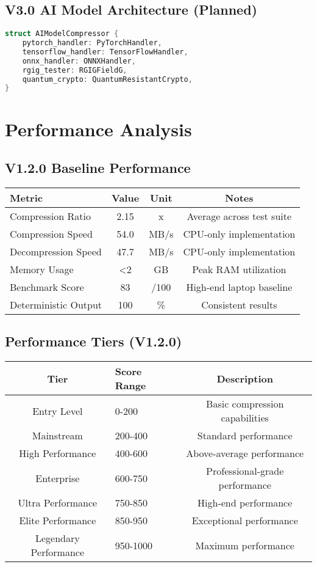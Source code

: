 \documentclass[12pt,a4paper]{article}
\begin{document}
\subsection{V3.0 AI Model Architecture (Planned)}
\begin{lstlisting}[language=C, caption=AI Model Compressor Structure]
struct AIModelCompressor {
    pytorch_handler: PyTorchHandler,
    tensorflow_handler: TensorFlowHandler,
    onnx_handler: ONNXHandler,
    rgig_tester: RGIGFieldG,
    quantum_crypto: QuantumResistantCrypto,
}
\end{lstlisting}

\newpage

\section{Performance Analysis}

\subsection{V1.2.0 Baseline Performance}
\begin{center}
\begin{tabular}{|l|c|c|c|}
\hline
\textbf{Metric} & \textbf{Value} & \textbf{Unit} & \textbf{Notes} \\
\hline
Compression Ratio & 2.15 & x & Average across test suite \\
Compression Speed & 54.0 & MB/s & CPU-only implementation \\
Decompression Speed & 47.7 & MB/s & CPU-only implementation \\
Memory Usage & <2 & GB & Peak RAM utilization \\
Benchmark Score & 83 & /100 & High-end laptop baseline \\
Deterministic Output & 100 & \% & Consistent results \\
\hline
\end{tabular}
\end{center}

\subsection{Performance Tiers (V1.2.0)}
\begin{center}
\begin{tabular}{|c|l|c|}
\hline
\textbf{Tier} & \textbf{Score Range} & \textbf{Description} \\
\hline
Entry Level & 0-200 & Basic compression capabilities \\
Mainstream & 200-400 & Standard performance \\
High Performance & 400-600 & Above-average performance \\
Enterprise & 600-750 & Professional-grade performance \\
Ultra Performance & 750-850 & High-end performance \\
Elite Performance & 850-950 & Exceptional performance \\
Legendary Performance & 950-1000 & Maximum performance \\
\hline
\end{tabular}
\end{center}
\end{document}
